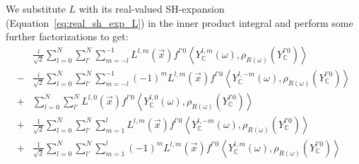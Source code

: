 \documentclass{egpubl}
\newcommand{\SHBC}{Y_{\mathbb{C}}} %
\begin{document}
We substitute $L$ with its real-valued SH-expansion (Equation~\ref{eq:real_sh_exp_L}) in the inner product integral and perform some further factorizations to get:
\begin{align*}
&
\frac{i}{\sqrt{2}}
\sum_{l=0}^{N}{
\sum_{l'}^{N}{
\sum_{m=-l}^{-1}{
L^{{l,m}}\left (\vec{x} \right )
f^{l'0}
\left<
\SHBC^{l, m}(\omega )
, \rho_{R\left(\omega\right)}
\left(
\SHBC^{l'0}
\right)
\right>
}
}
}
\\
-
&
\frac{i}{\sqrt{2}}
\sum_{l=0}^{N}{
\sum_{l'}^{N}{
\sum_{m=-l}^{-1}{
\left({-1}\right)^{m}
L^{{l,m}}\left (\vec{x} \right )
f^{l'0}
\left<
\SHBC^{l, -m}(\omega )
, \rho_{R\left(\omega\right)}
\left(
\SHBC^{l'0}
\right)
\right>
}
}
}
\\
+
&
\sum_{l=0}^{N}{
\sum_{l'}^{N}{
L^{{l,0}}\left (\vec{x} \right )
f^{l'0}
\left<
\SHBC^{l, 0}(\omega )
, \rho_{R\left(\omega\right)}
\left(
\SHBC^{l'0}
\right)
\right>
}
}
\\
+
&
\frac{1}{\sqrt{2}}
\sum_{l=0}^{N}{
\sum_{l'}^{N}{
\sum_{m=1}^{l}{
L^{{l,m}}\left (\vec{x} \right )
f^{l'0}
\left<
\SHBC^{l, -m}(\omega )
, \rho_{R\left(\omega\right)}
\left(
\SHBC^{l'0}
\right)
\right>
}
}
}
\\
+
&
\frac{1}{\sqrt{2}}
\sum_{l=0}^{N}{
\sum_{l'}^{N}{
\sum_{m=1}^{l}{
\left({-1}\right)^{m}
L^{{l,m}}\left (\vec{x} \right )
f^{l'0}
\left<
\SHBC^{l, m}(\omega )
, \rho_{R\left(\omega\right)}
\left(
\SHBC^{l'0}
\right)
\right>
}
}
}
\end{align*}
\end{document}
